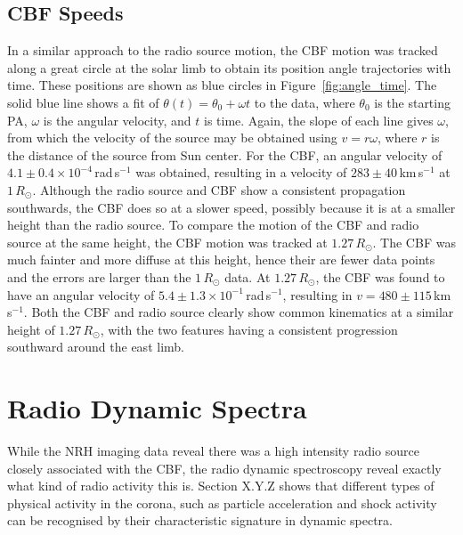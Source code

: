 \subsection{CBF Speeds}
In a similar approach to the radio source motion, the CBF motion was tracked along a great circle at the solar limb to obtain its position angle trajectories with time. These positions are shown as blue circles in Figure~\ref{fig:angle_time}. The solid blue line shows a fit of $\theta(t) = \theta_0 + \omega t$ to the data, where $\theta_0$ is the starting PA, $\omega$ is the angular velocity, and $t$ is time. Again, the slope of each line gives $\omega$, from which the velocity of the source may be obtained using $v=r\omega$, where $r$ is the distance of the source from Sun center. 
For the CBF, an angular velocity of $4.1\pm0.4\times10^{-4}$\,rad\,s$^{-1}$ was obtained, resulting in a velocity of $283\pm40$\,km\,s$^{-1}$ at $1\,R_{\odot}$. Although the radio source and CBF show a consistent propagation southwards, the CBF does so at a slower speed, possibly because it is at a smaller height than the radio source. To compare the motion of the CBF and radio source at the same height, the CBF motion was tracked at $1.27\,R_{\odot}$. The CBF was much fainter and more diffuse at this height, hence their are fewer data points and the errors are larger than the $1\,R_{\odot}$ data. At $1.27\,R_{\odot}$, the CBF was found to have an angular velocity of $5.4\pm1.3\times10^{-1}$\,rad\,s$^{-1}$, resulting in $v=480\pm115$\,km\,s$^{-1}$. Both the CBF and radio source clearly show common kinematics at a similar height of $1.27\,R_{\odot}$, with the two features having a consistent progression southward around the east limb. 



\section{Radio Dynamic Spectra}\label{sec:20}

While the NRH imaging data reveal there was a high intensity radio source closely associated with the CBF, the radio dynamic spectroscopy reveal exactly what kind of radio activity this is. Section X.Y.Z shows that different types of physical activity in the corona, such as particle acceleration and shock activity can be recognised by their characteristic signature in dynamic spectra. 

